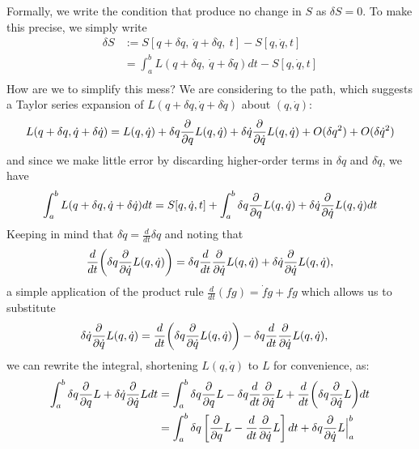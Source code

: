 \documentclass{article}
\newcommand{\md}{d}
\newcommand{\mderiv}[1]{\frac{\md}{\md {#1}}} %
\newcommand{\defined}{:=}
\newcommand{\mvar}{t}
\begin{document}
Formally, we write the condition that  produce no change in $S$ as $\delta S = 0$.  To make this precise, we simply write
\begin{align*}
\delta S 
&\defined S[q + \delta q,\ \dot{q} + \delta \dot{q},\ \mvar] - S[q, \dot{q},\mvar] \\
&= \int_{a}^{b} L(q + \delta q,\ \dot{q} + \delta \dot{q}) \md \mvar - S[q, \dot{q},\mvar] \\
\end{align*}
How are we to simplify this mess?  We are considering  to the path, which suggests a Taylor series expansion of $L(q + \delta q,\dot{q} + \delta \dot{q})$ about $(q, \dot{q})$:
\begin{equation*}
L(q + \delta q,\dot{q} + \delta \dot{q}) = L(q,\dot{q}) + \delta q \frac{\partial}{\partial {q}}L(q,\dot{q}) + \delta \dot{q} \frac{\partial}{\partial {\dot{q}}}L(q,\dot{q}) + O(\delta q^2) + O(\delta \dot{q}^2)
\end{equation*}
and since we make little error by discarding higher-order terms in $\delta q$ and $\delta \dot{q}$, we have
\begin{equation*}
\int_{a}^{b} L(q + \delta q,\dot{q} + \delta \dot{q}) \md \mvar 
= S[q, \dot{q}, \mvar] + \int_{a}^{b} \delta q \mpderiv{q}L(q,\dot{q}) + \delta \dot{q} \mpderiv{\dot{q}}L(q,\dot{q}) \md \mvar
\end{equation*}
Keeping in mind that $\delta \dot{q} = \mderiv{\mvar}{\delta q}$ and noting that
\begin{align*}
\mderiv{\mvar}{\left(\delta q \mpderiv{\dot{q}}L(q,\dot{q})\right)} &= \delta q \mderiv{\mvar}{\mpderiv{\dot{q}}L(q,\dot{q})} + \delta \dot{q} \mpderiv{\dot{q}}L(q,\dot{q}),\\
\end{align*}
a simple application of the product rule $\mderiv{\mvar}{(fg)} = \dot{f}g + f\dot{g}$ which allows us to substitute
\begin{align*}
\delta \dot{q} \mpderiv{\dot{q}}L(q,\dot{q}) &= \mderiv{\mvar}{\left(\delta q \mpderiv{\dot{q}}L(q,\dot{q})\right)} - \delta q \mderiv{\mvar}{\mpderiv{\dot{q}}L(q,\dot{q})},
\end{align*}
we can rewrite the integral, shortening $L(q,\dot{q})$ to $L$ for convenience, as:
\begin{align*}
\int_{a}^{b} \delta q \mpderiv{q} L + \delta \dot{q} \mpderiv{\dot{q}} L \md \mvar
&= \int_{a}^{b} \delta q \mpderiv{q} L - \delta q \mderiv{\mvar}{\mpderiv{\dot{q}} L} + \mderiv{\mvar}{\left(\delta q \mpderiv{\dot{q}} L \right)} \md \mvar\\
&= \int_{a}^{b} \delta q \left[ \mpderiv{q} L - \mderiv{\mvar}{\mpderiv{\dot{q}} L}\right] \md \mvar + \delta q \mpderiv{\dot{q}} L \Big|_{a}^{b}\\
\end{align*}
\end{document}
